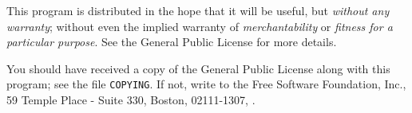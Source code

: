  This program is distributed in the hope that it will be useful,
 but \emph{without any warranty}; without even the implied warranty of
 \emph{merchantability} or \emph{fitness for a particular purpose}.
 See the
  General Public License for more details.

 You should have received a copy of the  General
 Public License
 along with this program; see the file \texttt{COPYING}.  If not,
 write to
 the Free Software Foundation, Inc., 59 Temple Place - Suite 330,
 Boston,  02111-1307, .





